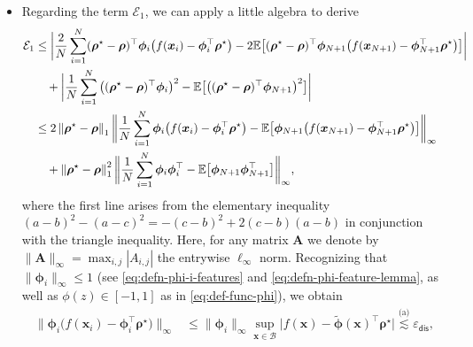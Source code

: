 \documentclass[english]{article}
\begin{document}
\begin{itemize}
\item 
Regarding the term $\mathcal{E}_1$, we can apply a little algebra to derive
%
\begin{align}\label{eq:proof-lem-empirical-boundE1-pre}
\mathcal{E}_1 
&\leq \bigg|\frac2N\sum_{i=1}^N ({\bm \rho}^{\star} - {\bm \rho})^{\top}{\bm \phi}_i\big(f({\bm x}_i)-{\bm \phi}_i^{\top}{\bm \rho}^{\star}\big)-2\mathbb{E}\big[({\bm \rho}^{\star} - {\bm \rho})^{\top}{\bm \phi}_{N+1}\big(f({\bm x}_{N+1})-{\bm \phi}_{N+1}^{\top}{\bm \rho}^{\star}\big)\big]\bigg|\notag\\
&\quad + \bigg|\frac1N\sum_{i=1}^N \big(({\bm \rho}^{\star} - {\bm \rho})^{\top}{\bm \phi}_i\big)^2-\mathbb{E}\big[\big(({\bm \rho}^{\star} - {\bm \rho})^{\top}{\bm \phi}_{N+1}\big)^2\big]\bigg|\notag\\
&\le 2\left\|{\bm \rho}^{\star} - {\bm \rho}\right\|_1\bigg\|\frac1N\sum_{i=1}^N {\bm \phi}_i\big(f({\bm x}_i)-{\bm \phi}_i^{\top}{\bm \rho}^{\star}\big)-\mathbb{E}\big[{\bm \phi}_{N+1}\big(f({\bm x}_{N+1})-{\bm \phi}_{N+1}^{\top}{\bm \rho}^{\star}\big)\big]\bigg\|_{\infty}\notag\\
&\quad + \left\|{\bm \rho}^{\star} - {\bm \rho}\right\|_1^2\bigg\|\frac1N\sum_{i=1}^N {\bm \phi}_i{\bm \phi}_i^{\top}-\mathbb{E}\big[{\bm \phi}_{N+1}{\bm \phi}_{N+1}^{\top}\big]\bigg\|_{\infty},
\end{align}
%
where the first line arises from the elementary inequality $(a-b)^{2}-(a-c)^{2}=-(c-b)^{2}+2(c-b)(a-b)$ in conjunction with the triangle inequality. Here, for any matrix $\bm{A}$ we denote by  $\|\bm{A}\|_{\infty}=\max_{i,j}|A_{i,j}|$ the entrywise $\ell_{\infty}$ norm. 
%
Recognizing that $\|{\bm \phi}_i\|_{\infty}\le 1$ (see \eqref{eq:defn-phi-i-features} and \eqref{eq:defn-phi-feature-lemma}, as well as  $\phi(z)\in [-1,1]$ as in \eqref{eq:def-func-phi}), we obtain
%
\begin{align*}
\big\|{\bm \phi}_i \big(f({\bm x}_i)-{\bm \phi}_i^{\top}{\bm \rho}^{\star} \big)\big\|_{\infty}
&\le\|\bm{\phi}_i\|_{\infty} \sup_{{\bm x}\in \mathcal{B}} \big|f({\bm x})-\widetilde{\bm \phi}({\bm x})^{\top}{\bm \rho}^{\star} \big|\overset{\text{(a)}}{\lesssim} \varepsilon_{\mathsf{dis}},\\

\end{align*}
\end{itemize}
\end{document}
